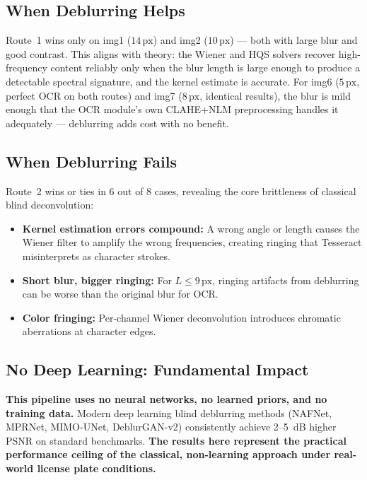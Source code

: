 \documentclass[12pt,a4paper]{article}
\begin{document}
\subsection{When Deblurring Helps}

Route~1 wins only on img1 ($14\,\mathrm{px}$) and img2 ($10\,\mathrm{px}$) --- both with
large blur and good contrast. This aligns with theory: the Wiener and HQS solvers
recover high-frequency content reliably only when the blur length is large enough to
produce a detectable spectral signature, and the kernel estimate is accurate.
For img6 ($5\,\mathrm{px}$, perfect OCR on both routes) and img7 ($8\,\mathrm{px}$,
identical results), the blur is mild enough that the OCR module's own CLAHE+NLM
preprocessing handles it adequately --- deblurring adds cost with no benefit.

\subsection{When Deblurring Fails}

Route~2 wins or ties in 6 out of 8 cases, revealing the core brittleness of classical
blind deconvolution:
\begin{itemize}[noitemsep, topsep=2pt]
  \item \textbf{Kernel estimation errors compound:} A wrong angle or length causes the
    Wiener filter to amplify the wrong frequencies, creating ringing that Tesseract
    misinterprets as character strokes.
  \item \textbf{Short blur, bigger ringing:} For $L \leq 9\,\mathrm{px}$, ringing
    artifacts from deblurring can be worse than the original blur for OCR.
  \item \textbf{Color fringing:} Per-channel Wiener deconvolution introduces chromatic
    aberrations at character edges.
\end{itemize}

\subsection{No Deep Learning: Fundamental Impact}

\textbf{This pipeline uses no neural networks, no learned priors, and no training data.}
Modern deep learning blind deblurring methods (NAFNet, MPRNet, MIMO-UNet, DeblurGAN-v2)
consistently achieve 2--5~dB higher PSNR on standard benchmarks.
\textbf{The results here represent the practical performance ceiling of the classical,
non-learning approach under real-world license plate conditions.}
\end{document}
